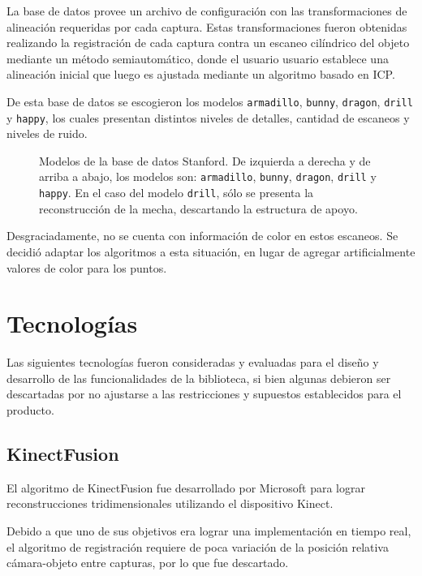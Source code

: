 La base de datos provee un archivo de configuración con las transformaciones de
alineación requeridas por cada captura.
Estas transformaciones fueron obtenidas realizando la registración de cada captura
contra un escaneo cilíndrico del objeto mediante un método semiautomático, donde el usuario
usuario establece una alineación inicial que luego es ajustada mediante un algoritmo
basado en ICP\cite{Turk:1994:ZPM:192161.192241}.

De esta base de datos se escogieron los modelos
	\texttt{armadillo},
	\texttt{bunny},
	\texttt{dragon},
	\texttt{drill} y
	\texttt{happy},
los cuales presentan distintos niveles de detalles, cantidad de escaneos y niveles de ruido.


\begin{figure}
	\caption[Modelos de la base de datos Stanford]{\label{fig:stanford_models}Modelos de la base de datos Stanford.
		De izquierda a derecha y de arriba a abajo, los modelos son:
		\texttt{armadillo},
		\texttt{bunny},
		\texttt{dragon},
		\texttt{drill}
		y \texttt{happy}.
		En el caso del modelo \texttt{drill}, sólo se presenta la reconstrucción de la mecha, descartando la estructura de apoyo.}
\end{figure}


Desgraciadamente, no se cuenta con información de color en estos escaneos.
Se decidió adaptar los algoritmos a esta situación, en lugar de agregar
artificialmente valores de color para los puntos.


\section{Tecnologías}
Las siguientes tecnologías fueron consideradas y evaluadas
para el diseño y desarrollo de las funcionalidades de la biblioteca,
si bien algunas debieron ser descartadas por no ajustarse a las restricciones
y supuestos establecidos para el producto.

	\subsection{KinectFusion}
El algoritmo de KinectFusion fue desarrollado por Microsoft
para lograr reconstrucciones tridimensionales utilizando el dispositivo Kinect.

	Debido a que uno de sus objetivos era lograr una implementación en tiempo
	real, el algoritmo de registración requiere de poca variación
	de la posición relativa cámara-objeto entre capturas, por lo que fue descartado.

